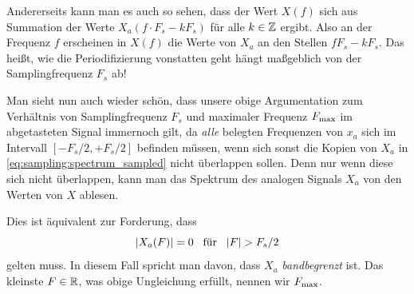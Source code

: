 Andererseits kann man es auch so sehen, dass der Wert $X(f)$ sich aus Summation der Werte $X_a(f \cdot F_s - k F_s)$ für alle $k \in \mathbb{Z}$ ergibt. 
Also an der Frequenz $f$ erscheinen in $X(f)$ die Werte von $X_a$ an den Stellen $f F_s - k F_s$.
Das heißt, wie die Periodifizierung vonstatten geht hängt maßgeblich von der Samplingfrequenz $F_s$ ab!

Man sieht nun auch wieder schön, dass unsere obige Argumentation zum Verhältnis von Samplingfrequenz $F_s$ und maximaler Frequenz $F_{\rm max}$ im abgetasteten Signal immernoch gilt, da \emph{alle} belegten Frequenzen von $x_a$ sich im Intervall $[-F_s/2,+F_s/2]$ befinden müssen, wenn sich sonst die Kopien von $X_a$ in \eqref{eq:sampling:spectrum_sampled} nicht überlappen sollen.
Denn nur wenn diese sich nicht überlappen, kann man das Spektrum des analogen Signals $X_a$ von den Werten von $X$ ablesen.

Dies ist äquivalent zur Forderung, dass
\[
{\left| X_a(F) \right|} = 0 {\hspace{3mm} \text{für} \hspace{3mm}} {\left| F \right|} > F_s/2
\]
gelten muss. 
In diesem Fall spricht man davon, dass $X_a$ \emph{bandbegrenzt} ist.
Das kleinste $F \in \mathbb{R}$, was obige Ungleichung erfüllt, nennen wir $F_{\rm max}$.

